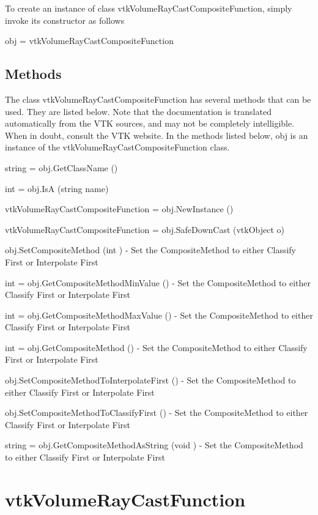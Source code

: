 To create an instance of class vtk\-Volume\-Ray\-Cast\-Composite\-Function, simply invoke its constructor as follows \begin{DoxyVerb}  obj = vtkVolumeRayCastCompositeFunction
\end{DoxyVerb}
 \hypertarget{vtkwidgets_vtkxyplotwidget_Methods}{}\subsection{Methods}\label{vtkwidgets_vtkxyplotwidget_Methods}
The class vtk\-Volume\-Ray\-Cast\-Composite\-Function has several methods that can be used. They are listed below. Note that the documentation is translated automatically from the V\-T\-K sources, and may not be completely intelligible. When in doubt, consult the V\-T\-K website. In the methods listed below, {\ttfamily obj} is an instance of the vtk\-Volume\-Ray\-Cast\-Composite\-Function class. 
\begin{DoxyItemize}
\item {\ttfamily string = obj.\-Get\-Class\-Name ()}  
\item {\ttfamily int = obj.\-Is\-A (string name)}  
\item {\ttfamily vtk\-Volume\-Ray\-Cast\-Composite\-Function = obj.\-New\-Instance ()}  
\item {\ttfamily vtk\-Volume\-Ray\-Cast\-Composite\-Function = obj.\-Safe\-Down\-Cast (vtk\-Object o)}  
\item {\ttfamily obj.\-Set\-Composite\-Method (int )} -\/ Set the Composite\-Method to either Classify First or Interpolate First  
\item {\ttfamily int = obj.\-Get\-Composite\-Method\-Min\-Value ()} -\/ Set the Composite\-Method to either Classify First or Interpolate First  
\item {\ttfamily int = obj.\-Get\-Composite\-Method\-Max\-Value ()} -\/ Set the Composite\-Method to either Classify First or Interpolate First  
\item {\ttfamily int = obj.\-Get\-Composite\-Method ()} -\/ Set the Composite\-Method to either Classify First or Interpolate First  
\item {\ttfamily obj.\-Set\-Composite\-Method\-To\-Interpolate\-First ()} -\/ Set the Composite\-Method to either Classify First or Interpolate First  
\item {\ttfamily obj.\-Set\-Composite\-Method\-To\-Classify\-First ()} -\/ Set the Composite\-Method to either Classify First or Interpolate First  
\item {\ttfamily string = obj.\-Get\-Composite\-Method\-As\-String (void )} -\/ Set the Composite\-Method to either Classify First or Interpolate First  
\end{DoxyItemize}\hypertarget{vtkvolumerendering_vtkvolumeraycastfunction}{}\section{vtk\-Volume\-Ray\-Cast\-Function}\label{vtkvolumerendering_vtkvolumeraycastfunction}
